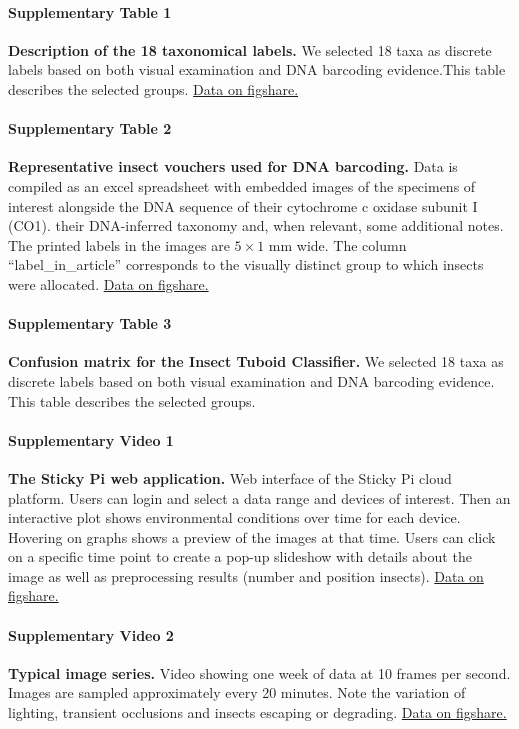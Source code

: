 \documentclass[12pt]{article}
\begin{document}
	\paragraph*{Supplementary Table 1}
	\textbf{Description of the 18 taxonomical labels.} We selected 18 taxa as discrete labels based on both visual examination and DNA barcoding evidence.This table describes the selected groups.
	\href{https://figshare.com/s/999a3b7a3c23a050b106}{Data on figshare.}
	
	\paragraph*{Supplementary Table 2}
	\textbf{Representative insect vouchers used for DNA barcoding.} 
	Data is compiled as an excel spreadsheet with embedded images of the specimens of interest alongside the DNA sequence of their cytochrome c oxidase subunit I (CO1). their DNA-inferred taxonomy and, when relevant, some additional notes. 
	The printed labels in the images are $5 \times{} 1$ mm wide. The column “label\_in\_article” corresponds to the visually distinct group to which insects were allocated.
	\href{https://figshare.com/s/bdb7bef8c26065e3dd17}{Data on figshare.}
	
	\paragraph*{Supplementary Table 3}
	\textbf{Confusion matrix for the Insect Tuboid Classifier.} We selected 18 taxa as discrete labels based on both visual examination and DNA barcoding evidence. This table describes the selected groups.
	
	
	
	\paragraph*{Supplementary Video 1}
	\textbf{The Sticky Pi web application.} Web interface of the Sticky Pi cloud platform. Users can login and select a data range and devices of interest. Then an interactive plot shows environmental conditions over time for each device. Hovering on graphs shows a preview of the images at that time. Users can click on a specific time point to create a pop-up slideshow with details about the image as well as preprocessing results (number and position insects).
	\href{https://figshare.com/s/e901a8943d4459cb8f08}{Data on figshare.}
	
	
	\paragraph*{Supplementary Video 2}
	\textbf{Typical image series.} Video showing one week of data at 10 frames per second. Images are sampled approximately every 20 minutes. Note the variation of lighting, transient occlusions and insects escaping or degrading.
	\href{https://figshare.com/s/02944865bfd645047355}{Data on figshare.}
	
\end{document}
